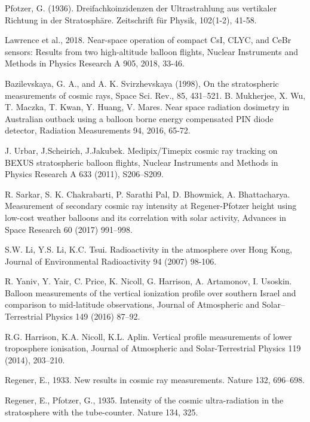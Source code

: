 \documentclass{Rpd}
\begin{document}
\begin{thebibliography}{99.}%

 Pfotzer, G. (1936). Dreifachkoinzidenzen der Ultrastrahlung aus vertikaler Richtung in der Stratosphäre. Zeitschrift für Physik, 102(1-2), 41-58.

 Lawrence et al., 2018. Near-space operation of compact CsI, CLYC, and CeBr sensors: Results from two high-altitude balloon flights, Nuclear Instruments and Methods in Physics Research A 905, 2018, 33-46.

 Bazilevskaya, G. A., and A. K. Svirzhevskaya (1998), On the stratospheric measurements of cosmic rays, Space Sci. Rev., 85, 431–521.
 B. Mukherjee, X. Wu, T. Maczka, T. Kwan, Y. Huang, V. Mares. Near space radiation dosimetry in Australian outback using a balloon borne energy compensated PIN diode detector, Radiation Measurements 94, 2016, 65-72. 

 J. Urbar, J.Scheirich, J.Jakubek. Medipix/Timepix cosmic ray tracking on BEXUS stratospheric balloon flights, Nuclear Instruments and Methods in Physics Research A 633 (2011), S206–S209. 

 R. Sarkar, S. K. Chakrabarti, P. Sarathi Pal, D. Bhowmick, A. Bhattacharya. Measurement of secondary cosmic ray intensity at Regener-Pfotzer height using low-cost weather balloons and its correlation with solar activity, Advances in Space Research 60 (2017) 991–998. 

 S.W. Li, Y.S. Li, K.C. Tsui. Radioactivity in the atmosphere over Hong Kong, Journal of Environmental Radioactivity 94 (2007) 98-106. 
	
 R. Yaniv, Y. Yair, C. Price, K. Nicoll, G. Harrison, A. Artamonov, I. Usoskin. Balloon measurements of the vertical ionization profile over southern Israel and comparison to mid-latitude observations, Journal of Atmospheric and Solar–Terrestrial Physics 149 (2016) 87–92. 

 R.G. Harrison, K.A. Nicoll, K.L. Aplin. Vertical profile measurements of lower troposphere ionisation, Journal of Atmospheric and Solar-Terrestrial Physics 119 (2014), 203–210. 

 Regener, E., 1933. New results in cosmic ray measurements. Nature 132, 696–698.

 Regener, E., Pfotzer, G., 1935. Intensity of the cosmic ultra-radiation in the stratosphere with the tube-counter. Nature 134, 325.


\end{thebibliography}
\end{document}
